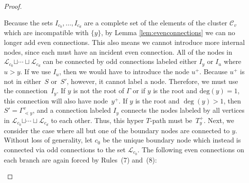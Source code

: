 \documentclass[pdftex]{sigma}
\numberwithin{equation}{section}
\newcommand{\new}[1]{{#1}}
\begin{document}
\begin{proof}
\begin{center}
\end{center}
Because the sets $I_{c_0},\ldots,I_{c_d}$ are a complete set of the elements of the cluster $\mathcal{C}_v$ which are incompatible with \new{$\{y\}$}, by Lemma \ref{lem:evenconnections} we can no longer add even connections. This also means we cannot introduce more internal nodes, since each must have an incident even connection. All of the nodes in $\mathcal{L}_{c_0} \new{\sqcup \cdots \sqcup} \mathcal{L}_{c_d}$ can be connected by odd connections labeled either $I_y$ or $I_u$ where $u > y$. If we use $I_u$, then we would have to introduce the node $u^+$. Because $u^{+}$ is not in either~$S$ or~$S'$, however, it cannot label a node. Therefore, we must use the connection~$I_y$. If $y$ is not the root of $\Gamma$ or if $y$ is the root and $\textrm{deg}(y) = 1$, this connection will also have node~$y^+$. If $y$ is the root and $\deg(y) > 1$, then $S' = \Gamma_{\lessdot y}^v$, and a connection labeled $I_y$ connects the nodes labeled by all vertices in $\mathcal{L}_{c_0} \new{\sqcup \cdots \sqcup} \mathcal{L}_{c_d}$ to each other. Thus, this hyper $T$-path must be~$T_y^{+}$.
Next, we consider the case where all but one of the boundary nodes are connected to $y$. Without loss of generality, let $c_0$ be the unique boundary node which instead is connected via odd connections to the set $\mathcal{L}_{c_0}$. The following even connections on each branch are again forced by Rules~(7) and~(8):
\begin{center}
\end{center}
\end{proof}
\end{document}
